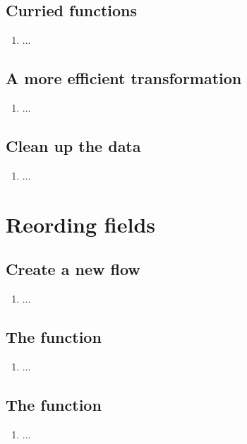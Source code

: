 \subsection{Curried functions}
\begin{enumerate}[resume*]
\item ...
\end{enumerate}

\subsection{A more efficient transformation}
\begin{enumerate}[resume*]
\item ...
\end{enumerate}

\subsection{Clean up the data}
\begin{enumerate}[resume*]
\item ...
\end{enumerate}

\section{Reording fields}

\subsection{Create a new flow}
\begin{enumerate}
\item ...
\end{enumerate}

\subsection{The  function}
\begin{enumerate}[resume*]
\item ...
\end{enumerate}

\subsection{The  function}
\begin{enumerate}[resume*]
\item ...
\end{enumerate}


